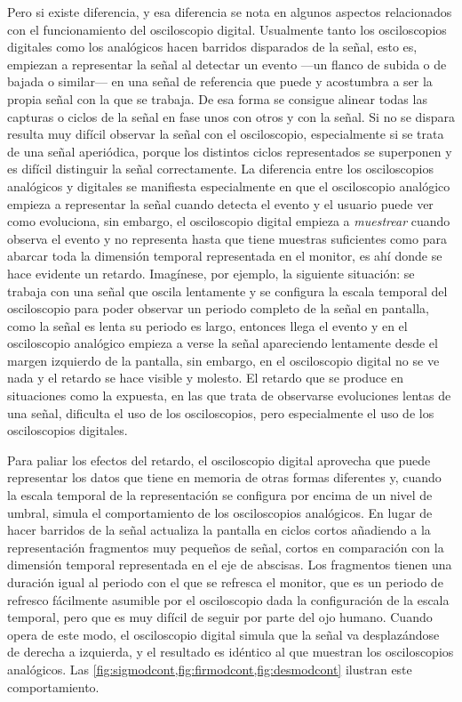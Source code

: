Pero si existe diferencia, y esa diferencia se nota en algunos aspectos
relacionados con el funcionamiento del osciloscopio digital. Usualmente
tanto los osciloscopios digitales como los analógicos hacen barridos
disparados de la señal, esto es, empiezan a representar la señal al
detectar un evento ---un flanco de subida o de bajada o similar--- en una
señal de referencia que puede y acostumbra a ser la propia señal con la que
se trabaja. De esa forma se consigue alinear todas las capturas o ciclos de
la señal en fase unos con otros y con la señal. Si no se dispara resulta
muy difícil observar la señal con el osciloscopio, especialmente si se
trata de una señal aperiódica, porque los distintos ciclos representados se
superponen y es difícil distinguir la señal correctamente. La diferencia
entre los osciloscopios analógicos y digitales se manifiesta especialmente
en que el osciloscopio analógico empieza a representar la señal cuando
detecta el evento y el usuario puede ver como evoluciona, sin embargo, el
osciloscopio digital empieza a \emph{muestrear} cuando observa el evento y
no representa hasta que tiene muestras suficientes como para abarcar toda
la dimensión temporal representada en el monitor, es ahí donde se hace
evidente un retardo. Imagínese, por ejemplo, la siguiente situación: se
trabaja con una señal que oscila lentamente y se configura la escala
temporal del osciloscopio para poder observar un periodo completo de la
señal en pantalla, como la señal es lenta su periodo es largo, entonces
llega el evento y en el osciloscopio analógico empieza a verse la señal
apareciendo lentamente desde el margen izquierdo de la pantalla, sin
embargo, en el osciloscopio digital no se ve nada y el retardo se hace
visible y molesto. El retardo que se produce en situaciones como la
expuesta, en las que trata de observarse evoluciones lentas de una señal,
dificulta el uso de los osciloscopios, pero especialmente el uso de los
osciloscopios digitales.

Para paliar los efectos del retardo, el osciloscopio digital aprovecha que
puede representar los datos que tiene en memoria de otras formas diferentes
y, cuando la escala temporal de la representación se configura por encima
de un nivel de umbral, simula el comportamiento de los osciloscopios
analógicos. En lugar de hacer barridos de la señal actualiza la pantalla
en ciclos cortos añadiendo a la representación fragmentos muy pequeños de
señal, cortos en comparación con la dimensión temporal representada en el
eje de abscisas. Los fragmentos tienen una duración igual al periodo con el
que se refresca el monitor, que es un periodo de refresco fácilmente
asumible por el osciloscopio dada la configuración de la escala temporal,
pero que es muy difícil de seguir por parte del ojo humano. Cuando opera de
este modo, el osciloscopio digital simula que la señal va desplazándose de
derecha a izquierda, y el resultado es idéntico al que muestran los
osciloscopios analógicos. Las
\vref{fig:sigmodcont,fig:firmodcont,fig:desmodcont} ilustran este
comportamiento.


